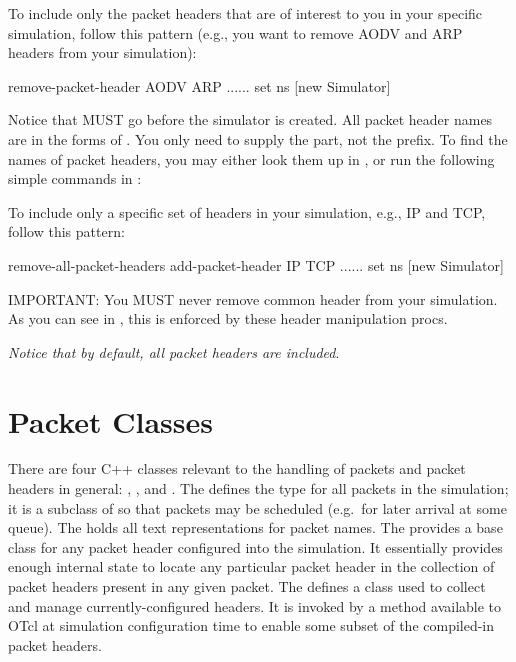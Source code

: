 To include only the packet headers that are of interest to you in your 
specific simulation, follow this pattern (e.g., you want to remove AODV
and ARP headers from your simulation):
\begin{program}
        remove-packet-header AODV ARP
        ......
        set ns [new Simulator]
\end{program}
Notice that  MUST go before the simulator
is created.
All packet header names are in the forms of
. 
You only need to supply the \code{[hdr]} part, not the prefix.
To find the names of packet headers, you may either look them up in 
, or run the following simple commands in
\ns: 

To include only a specific set of headers in your simulation, e.g., IP
and TCP, follow this pattern:
\begin{program}
        remove-all-packet-headers
        add-packet-header IP TCP
        ......
        set ns [new Simulator]
\end{program}
IMPORTANT: You MUST never remove common header from your
simulation. 
As you can see in , this is enforced
by these header manipulation procs.

{\em Notice that by default, all packet headers are included}.

\section{Packet Classes}
\label{sec:packetclasses}

There are four C++ classes relevant to the handling of packets
and packet headers in general: , 
, and .
The 
defines the type for all packets in the simulation;
it is a subclass of  so that packets may
be scheduled (e.g.~for later arrival at some queue).
The  holds all text
representations for packet names.
The  provides a base class for
any packet header configured into the simulation.
It essentially provides 
enough internal state to locate any particular packet
header in the collection of packet headers present in any given packet.
The 
defines a class used to collect and manage currently-configured headers.
It is invoked by a method available to OTcl at simulation configuration
time to enable some subset of the compiled-in packet headers.

